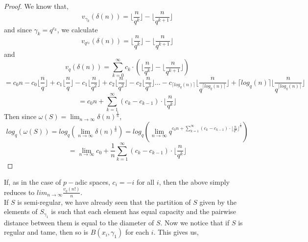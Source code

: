 \begin{proof}
	We know that,
\[v_{\gamma_k}(\delta(n)) =  \lfloor\frac{n}{q^k}\rfloor - \lfloor\frac{n}{q^{k+1}}\rfloor \]
and since $\gamma_k = q^{c_k}$, we calculate
\[v_{q^{c_k}}(\delta(n)) =  \lfloor\frac{n}{q^k}\rfloor - \lfloor\frac{n}{q^{k+1}}\rfloor \]
and
\[v_{q}(\delta(n)) =  \sum_{k=0}^{\infty} c_k \cdot(\lfloor\frac{n}{q^k}\rfloor - \lfloor\frac{n}{q^{k+1}}\rfloor) \]
\[=  c_0n - c_0\lfloor\frac{n}{q}\rfloor + c_1\lfloor\frac{n}{q}\rfloor - c_1\lfloor\frac{n}{q^{2}}\rfloor  + c_2\lfloor\frac{n}{q^2}\rfloor - c_2\lfloor\frac{n}{q^{3}}\rfloor \ldots - c_{\lceil log_q(n) \rceil} \lfloor\frac{n}{q^{\lceil log_q(n) \rceil}}\rfloor + \lceil log_q(n) \rceil\lfloor\frac{n}{q^{\lceil log_q(n) \rceil}}\rfloor  \]
\[=  c_0n + \sum_{k=1}^{\infty} (c_{k} - c_{k-1}) \cdot \lfloor\frac{n}{q^{k}}\rfloor \]
Then since $\omega(S) = \lim_{n\to\infty} \delta(n) ^{\frac{1}{n}}$,
\[log_q(\omega(S)) = log_q(\lim_{n\to\infty} \delta(n) ^{\frac{1}{n}}) = log_q(\lim_{n\to\infty}q^{{c_0n + \sum_{k=1}^{\infty} (c_{k} - c_{k-1}) \cdot \lfloor\frac{n}{q^{k}}\rfloor}^{\frac{1}{n}}})\]
 \[=\lim_{n\to\infty} c_0 + \frac{1}{n}\sum_{k=1}^{\infty} (c_{k} - c_{k-1}) \cdot \lfloor\frac{n}{q^{k}}\rfloor \] 
\end{proof}

If, as in the case of $p-$adic spaces, $c_i=-i$ for all $i$, then the above simply reduces to $lim_{n\to\infty} \frac{v_q(n!)}{n}$.\\ %

If $S$ is semi-regular, we have already seen that the partition of $S$ given by the elements of $S_{\gamma_1}$ is such that each element has equal capacity and the pairwise distance between them is equal to the diameter of $S$. Now we notice that if $S$ is regular and tame, then so is $B(x_i,\gamma_1)$ for each $i$. This gives us, 

